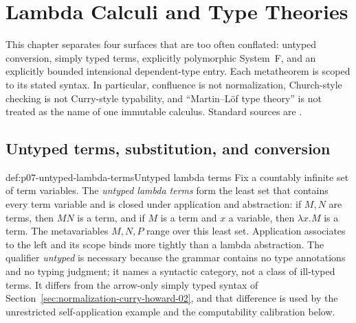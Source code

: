 
\chapter{Lambda Calculi and Type Theories}
\label{sec:p07-lambda-calculi-and-type-theories}

This chapter separates four surfaces that are too often conflated: untyped
conversion, simply typed terms, explicitly polymorphic System~F, and an
explicitly bounded intensional dependent-type entry.  Each metatheorem is scoped to its stated
syntax.  In particular, confluence is not normalization, Church-style
checking is not Curry-style typability, and ``Martin--L\"of type theory'' is
not treated as the name of one immutable calculus.  Standard sources are
\cite{Church1936,ChurchRosser1936,Barendregt1984,
GirardLafontTaylor1989,MartinLof1984}.

\section{Untyped terms, substitution, and conversion}

\begin{hbdefinition}{def:p07-untyped-lambda-terms}{Untyped lambda terms}
Fix a countably infinite set of term variables.  The \emph{untyped lambda
terms} form the least set that contains every term variable and is closed
under application and abstraction: if \(M,N\) are terms, then \(MN\) is a
term, and if \(M\) is a term and \(x\) a variable, then \(\lambda x.M\) is a
term.  The metavariables \(M,N,P\) range over this least set.
Application associates to the left and its scope binds more tightly than a
lambda abstraction.  The qualifier \emph{untyped} is necessary because the
grammar contains no type annotations and no typing judgment; it names a
syntactic category, not a class of ill-typed terms.  It differs from the
arrow-only simply typed syntax of Section~\ref{sec:normalization-curry-howard-02}, and that
difference is used by the unrestricted self-application example and the
computability calibration below.
\end{hbdefinition}

